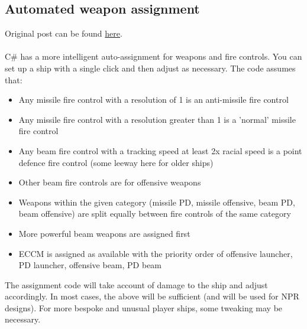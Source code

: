 \documentclass[../../Aurora C# unofficial manual.tex]{subfiles}
\begin{document}
	\subsection{Automated weapon assignment}
	Original post can be found
	\href{http://aurora2.pentarch.org/index.php?topic=8495.msg107378#msg107378}{here}.
	\\\\
	
	C\# has a more intelligent auto-assignment for weapons and fire controls. You can set up a ship with a single click and then adjust as necessary. The code assumes that:
	\begin{itemize}
		\item Any missile fire control with a resolution of 1 is an anti-missile fire control
		\item Any missile fire control with a resolution greater than 1 is a 'normal' missile fire control
		\item Any beam fire control with a tracking speed at least 2x racial speed is a point defence fire control (some leeway here for older ships)
		\item Other beam fire controls are for offensive weapons
		\item Weapons within the given category (missile PD, missile offensive, beam PD, beam offensive) are split equally between fire controls of the same category
		\item More powerful beam weapons are assigned first
		\item ECCM is assigned as available with the priority order of offensive launcher, PD launcher, offensive beam, PD beam
	\end{itemize}
	
	The assignment code will take account of damage to the ship and adjust accordingly. In most cases, the above will be sufficient (and will be used for NPR designs). For more bespoke and unusual player ships, some tweaking may be necessary.
	
\end{document}
